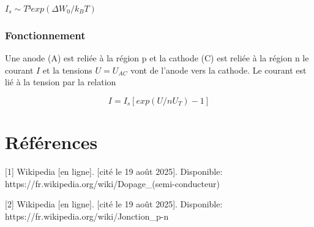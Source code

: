             \begin{math}
                I_s \sim T³exp(\Delta W_0/k_BT)
            \end{math}
        

        \subsubsection{Fonctionnement}
            Une anode (A) est reliée à la région p et la cathode (C) est reliée à la région n le courant $I$ et la tensions $U= U_{AC}$ vont de l'anode vers la cathode. Le courant est lié à la tension par la relation 

            \begin{equation}
                I = I_s[exp(U/nU_T)-1]
            \end{equation}

    \section{Références}
        [1] Wikipedia [en ligne]. [cité le 19 août 2025]. Disponible: https://fr.wikipedia.org/wiki/Dopage_(semi-conducteur)

        [2] Wikipedia [en ligne]. [cité le 19 août 2025]. Disponible: https://fr.wikipedia.org/wiki/Jonction_p-n


